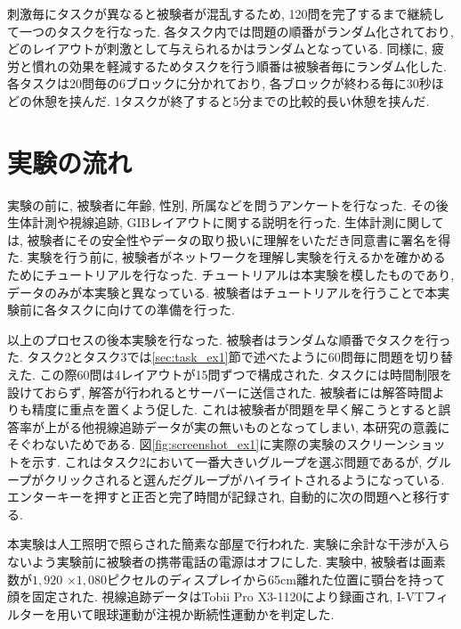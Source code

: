 \documentclass{kuee}
\begin{document}
刺激毎にタスクが異なると被験者が混乱するため, 120問を完了するまで継続して一つのタスクを行なった.
各タスク内では問題の順番がランダム化されており, どのレイアウトが刺激として与えられるかはランダムとなっている.
同様に, 疲労と慣れの効果を軽減するためタスクを行う順番は被験者毎にランダム化した.
各タスクは20問毎の6ブロックに分かれており, 各ブロックが終わる毎に30秒ほどの休憩を挟んだ.
1タスクが終了すると5分までの比較的長い休憩を挟んだ.

\section{実験の流れ}
実験の前に, 被験者に年齢, 性別, 所属などを問うアンケートを行なった.
その後生体計測や視線追跡, GIBレイアウトに関する説明を行った.
生体計測に関しては, 被験者にその安全性やデータの取り扱いに理解をいただき同意書に署名を得た.
実験を行う前に, 被験者がネットワークを理解し実験を行えるかを確かめるためにチュートリアルを行なった.
チュートリアルは本実験を模したものであり, データのみが本実験と異なっている.
被験者はチュートリアルを行うことで本実験前に各タスクに向けての準備を行った.

以上のプロセスの後本実験を行なった.
被験者はランダムな順番でタスクを行った.
タスク2とタスク3では\ref{sec:task_ex1}節で述べたように60問毎に問題を切り替えた.
この際60問は4レイアウトが15問ずつで構成された.
タスクには時間制限を設けておらず, 解答が行われるとサーバーに送信された.
被験者には解答時間よりも精度に重点を置くよう促した.
これは被験者が問題を早く解こうとすると誤答率が上がる他視線追跡データが実の無いものとなってしまい, 本研究の意義にそぐわないためである.
図\ref{fig:screenshot_ex1}に実際の実験のスクリーンショットを示す.
これはタスク2において一番大きいグループを選ぶ問題であるが, グループがクリックされると選んだグループがハイライトされるようになっている.
エンターキーを押すと正否と完了時間が記録され, 自動的に次の問題へと移行する.

本実験は人工照明で照らされた簡素な部屋で行われた.
実験に余計な干渉が入らないよう実験前に被験者の携帯電話の電源はオフにした.
実験中, 被験者は画素数が$1,920$ $\times 1,080$ピクセルのディスプレイから65cm離れた位置に顎台を持って顔を固定された.
視線追跡データはTobii Pro X3-1120により録画され, I-VTフィルター\cite{olsen2012tobii}を用いて眼球運動が注視か断続性運動かを判定した.
\end{document}
